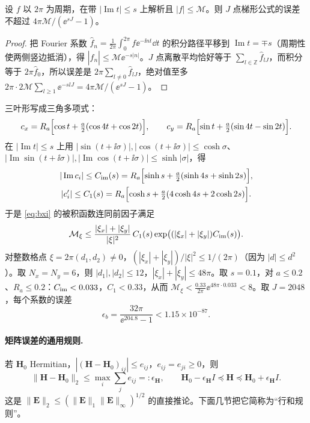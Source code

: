 \documentclass[11pt,a4paper,fontset=fandol]{ctexart}
\begin{document}
\begin{lemma}[周期梯形公式]
\label{lem:trapezoid}
设 $f$ 以 $2\pi$ 为周期，在带 $|\operatorname{Im}t|\le s$ 上解析且 $|f|\le\mathcal M$。则 $J$ 点梯形公式的误差不超过 $4\pi\mathcal M/(\ee^{sJ}-1)$。
\end{lemma}

\begin{proof}
把 Fourier 系数 $\hat f_n=\frac1{2\pi}\int_0^{2\pi}f\ee^{-\ii nt}\dd t$ 的积分路径平移到 $\operatorname{Im}t=\mp s$（周期性使两侧竖边抵消），得 $|\hat f_n|\le\mathcal M\ee^{-s|n|}$。$J$ 点离散平均恰好等于 $\sum_{l\in\mathbb Z}\hat f_{lJ}$，而积分等于 $2\pi\hat f_0$，所以误差是 $2\pi\sum_{l\ne0}\hat f_{lJ}$，绝对值至多 $2\pi\cdot2\mathcal M\sum_{l\ge1}\ee^{-slJ}=4\pi\mathcal M/(\ee^{sJ}-1)$。
\end{proof}

三叶形写成三角多项式：
\[
c_x=R_a\Bigl[\cos t+\tfrac a2(\cos4t+\cos2t)\Bigr],\qquad c_y=R_a\Bigl[\sin t+\tfrac a2(\sin4t-\sin2t)\Bigr].
\]
在 $|\operatorname{Im}t|\le s$ 上用 $|\sin(t+\ii\sigma)|,|\cos(t+\ii\sigma)|\le\cosh\sigma$、$|\operatorname{Im}\sin(t+\ii\sigma)|,|\operatorname{Im}\cos(t+\ii\sigma)|\le\sinh|\sigma|$，得
\begin{gather*}
|\operatorname{Im}c_i|\le C_{\rm im}(s)=R_a\Bigl[\sinh s+\tfrac a2(\sinh4s+\sinh2s)\Bigr],\\
|c_i'|\le C_1(s)=R_a\Bigl[\cosh s+\tfrac a2(4\cosh4s+2\cosh2s)\Bigr].
\end{gather*}
于是 \eqref{eq:bxi} 的被积函数连同前因子满足
\[
\mathcal M_\xi\le\frac{|\xi_x|+|\xi_y|}{|\xi|^2}\,C_1(s)\exp\bigl((|\xi_x|+|\xi_y|)C_{\rm im}(s)\bigr).
\]
对整数格点 $\xi=2\pi(d_1,d_2)\ne0$，$(|\xi_x|+|\xi_y|)/|\xi|^2\le1/(2\pi)$（因为 $|d|\le d^2$）。取 $N_x=N_y=6$，则 $|d_1|,|d_2|\le12$，$|\xi_x|+|\xi_y|\le48\pi$。取 $s=0.1$，对 $a\le0.2$、$R_a\le0.2$：$C_{\rm im}<0.033$，$C_1<0.33$，从而 $\mathcal M_\xi<\frac{0.33}{2\pi}\ee^{48\pi\cdot0.033}<8$。取 $J=2048$，每个系数的误差
\[
\epsilon_b=\frac{32\pi}{\ee^{204.8}-1}<1.15\times10^{-87}.
\]

\paragraph{矩阵误差的通用规则.} 若 $\bm H_0$ Hermitian，$|(\bm H-\bm H_0)_{ij}|\le e_{ij}$，$e_{ij}=e_{ji}\ge0$，则
\begin{equation}
\label{eq:rowsum}
\|\bm H-\bm H_0\|_2\le\max_i\sum_je_{ij}=:\epsilon_{\bm H},\qquad \bm H_0-\epsilon_{\bm H}I\preceq\bm H\preceq\bm H_0+\epsilon_{\bm H}I .
\end{equation}
这是 $\|\bm E\|_2\le(\|\bm E\|_1\|\bm E\|_\infty)^{1/2}$ 的直接推论。下面几节把它简称为“行和规则”。
\end{document}
